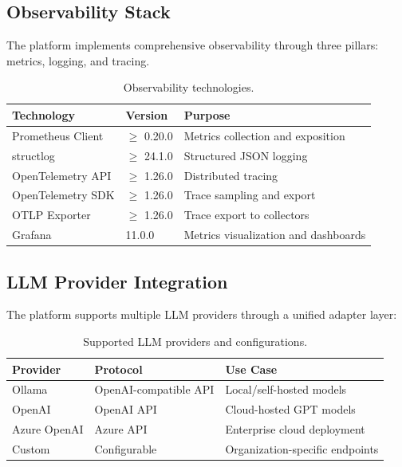 \subsection{Observability Stack}

The platform implements comprehensive observability through three pillars: metrics, logging, and tracing.

\begin{table}[ht]
\centering
\caption{Observability technologies.}
\label{tab:observability-stack}
\small
\begin{tabular}{lll}
\hline
\textbf{Technology} & \textbf{Version} & \textbf{Purpose} \\
\hline
Prometheus Client & $\geq$ 0.20.0 & Metrics collection and exposition \\
structlog & $\geq$ 24.1.0 & Structured JSON logging \\
OpenTelemetry API & $\geq$ 1.26.0 & Distributed tracing \\
OpenTelemetry SDK & $\geq$ 1.26.0 & Trace sampling and export \\
OTLP Exporter & $\geq$ 1.26.0 & Trace export to collectors \\
Grafana & 11.0.0 & Metrics visualization and dashboards \\
\hline
\end{tabular}
\end{table}

\subsection{LLM Provider Integration}

The platform supports multiple LLM providers through a unified adapter layer:

\begin{table}[ht]
\centering
\caption{Supported LLM providers and configurations.}
\label{tab:llm-providers}
\small
\begin{tabular}{lll}
\hline
\textbf{Provider} & \textbf{Protocol} & \textbf{Use Case} \\
\hline
Ollama & OpenAI-compatible API & Local/self-hosted models \\
OpenAI & OpenAI API & Cloud-hosted GPT models \\
Azure OpenAI & Azure API & Enterprise cloud deployment \\
Custom & Configurable & Organization-specific endpoints \\
\hline
\end{tabular}
\end{table}

